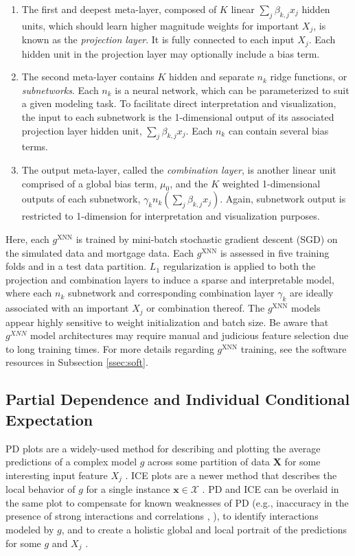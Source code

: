 \documentclass[information,article,submit,moreauthors,pdftex]{definitions/mdpi}
\begin{document}
\begin{enumerate}[leftmargin=*,labelsep=4.9mm]
\item The first and deepest meta-layer, composed of $K$ linear $\sum_j\beta_{k,j}x_j$ hidden units, which should learn higher magnitude weights for important $X_j$, is known as the \textit{projection layer}. It is fully connected to each input $X_j$. Each hidden unit in the projection layer may optionally include a bias term.
\item The second meta-layer contains $K$ hidden and separate $n_k$ ridge functions, or \textit{subnetworks}. Each $n_k$ is a neural network, which can be parameterized to suit a given modeling task. To facilitate direct interpretation and visualization, the input to each subnetwork is the 1-dimensional output of its associated projection layer hidden unit, $\sum_j\beta_{k,j}x_j$. Each $n_k$ can contain several bias terms.
\item The output meta-layer, called the \textit{combination layer}, is another linear unit comprised of a global bias term, $\mu_0$, and the $K$ weighted 1-dimensional outputs of each subnetwork, $\gamma_kn_k(\sum_j\beta_{k,j}x_j)$. Again, subnetwork output is restricted to 1-dimension for interpretation and visualization purposes.
\end{enumerate}

Here, each $g^\text{XNN}$ is trained by mini-batch stochastic gradient descent (SGD) on the simulated data and mortgage data. Each $g^\text{XNN}$ is assessed in five training folds and in a test data partition. $L_1$ regularization is applied to both the projection and combination layers to induce a sparse and interpretable model, where each $n_k$ subnetwork and corresponding combination layer $\gamma_k$ are ideally associated with an important $X_j$ or combination thereof. The $g^\text{XNN}$ models appear highly sensitive to weight initialization and batch size. Be aware that $g^{XNN}$ model architectures may require manual and judicious feature selection due to long training times. For more details regarding $g^\text{XNN}$ training, see the software resources in Subsection \ref{ssec:soft}. 

\subsection{Partial Dependence and Individual Conditional Expectation}\label{ssec:pd_ice}

PD plots are a widely-used method for describing and plotting the average predictions of a complex model $g$ across some partition of data $\mathbf{X}$ for some interesting input feature $X_j$ \cite{esl}. ICE plots are a newer method that describes the local behavior of $g$ for a single instance $\mathbf{x} \in \mathcal{X}$ \cite{ice_plots}. PD and ICE can be overlaid in the same plot to compensate for known weaknesses of PD (e.g., inaccuracy in the presence of strong interactions and correlations \cite{ice_plots}, \cite{ale_plot}), to identify interactions modeled by $g$, and to create a holistic global and local portrait of the predictions for some $g$ and $X_j$ \cite{ice_plots}.
\end{document}
